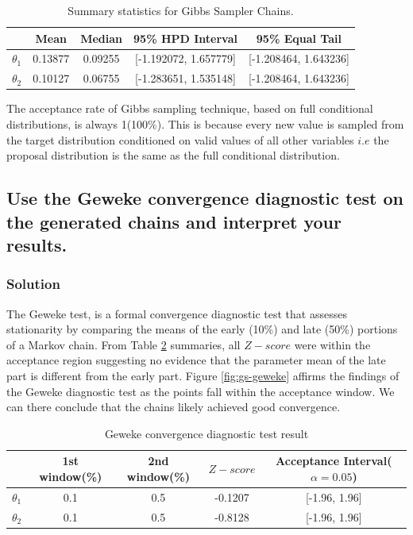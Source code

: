 \documentclass[12pt]{article}
\begin{document}
\begin{table}[h!]
\centering
\caption{Summary statistics for Gibbs Sampler Chains.}
\begin{tabular}{lcccc}
\toprule
\textbf{} & \textbf{Mean} & \textbf{Median} & \textbf{95\% HPD Interval}  & \textbf{95\% Equal Tail} \\
\midrule
$\theta_1$ & 0.13877 & 0.09255 & [-1.192072, 1.657779] & [-1.208464, 1.643236] \\
$\theta_2$ & 0.10127 & 0.06755 & [-1.283651, 1.535148] & [-1.208464, 1.643236] \\
\bottomrule
\end{tabular}
\label{tab:summary_gs}
\end{table}

The acceptance rate of Gibbs sampling technique, based on full conditional distributions, is always 1(100\%). This is because every new value is sampled from the target distribution conditioned on valid values of all other variables $i.e$ the proposal distribution is the same as the full conditional distribution.
\subsection{Use the Geweke convergence diagnostic test on the generated chains and interpret your results.}
\subsubsection{Solution}
The Geweke test, is a formal convergence diagnostic test that assesses stationarity by comparing the means of the early (10\%) and late (50\%) portions of a Markov chain. From Table \ref{tab:geweke_gs} summaries, all $Z-score$ were within the acceptance region suggesting no evidence that the parameter mean of the late part is different from the early part. Figure \ref{fig:gs-geweke}   affirms the findings of the Geweke diagnostic test as the points fall within the acceptance window. We can there conclude that the chains likely achieved good convergence.
\begin{table}[h!]
\centering
\caption{Geweke convergence diagnostic test result}
\begin{tabular}{lcccc}
\toprule
\textbf{} & \textbf{1st window(\%)} & \textbf{2nd window(\%)} & \textbf{$Z-score$} & \textbf{Acceptance Interval($\alpha = 0.05$)}  \\
\midrule
$\theta_1$ & 0.1& 0.5 & -0.1207  & [-1.96, 1.96] \\
$\theta_2$ & 0.1& 0.5 & -0.8128 & [-1.96, 1.96] \\
\bottomrule
\end{tabular}
\label{tab:geweke_gs}
\end{table}
\end{document}
